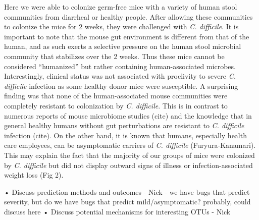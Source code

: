 \documentclass[11pt,]{article}
\begin{document}
Here we were able to colonize germ-free mice with a variety of human
stool communities from diarrheal or healthy people. After allowing these
communities to colonize the mice for 2 weeks, they were challenged with
\emph{C. difficile}. It is important to note that the mouse gut
environment is different from that of the human, and as such exerts a
selective pressure on the human stool microbial community that
stabilizes over the 2 weeks. Thus these mice cannot be considered
``humanized'' but rather containing human-associated microbes.
Interestingly, clinical status was not associated with proclivity to
severe \emph{C. difficile} infection as some healthy donor mice were
susceptible. A surprising finding was that none of the human-associated
mouse communities were completely resistant to colonization by \emph{C.
difficile}. This is in contrast to numerous reports of mouse microbiome
studies (cite) and the knowledge that in general healthy humans without
gut perturbations are resistant to \emph{C. difficile} infection (cite).
On the other hand, it is known that humans, especially health care
employees, can be asymptomatic carriers of \emph{C. difficile}
(Furyura-Kanamari). This may explain the fact that the majority of our
groups of mice were colonized by \emph{C. difficile} but did not display
outward signs of illness or infection-associated weight loss (Fig 2).

• Discuss prediction methods and outcomes - Nick - we have bugs that
predict severity, but do we have bugs that predict mild/asymptomatic?
probably, could discuss here • Discuss potential mechanisms for
interesting OTUs - Nick
\end{document}
